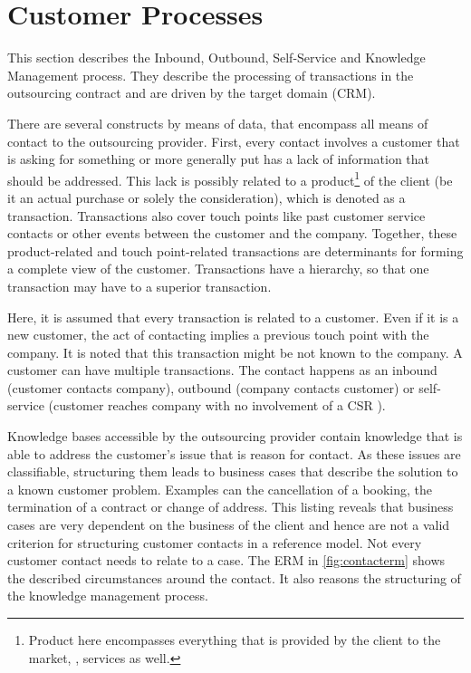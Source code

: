 	\section{Customer Processes}
	
	This section describes the Inbound, Outbound, Self-Service and Knowledge Management process. They describe the processing of transactions in the outsourcing contract and are driven by the target domain (\acrshort{CRM}). 
	
	There are several constructs by means of data, that encompass all means of contact to the outsourcing provider. First, every contact involves a customer that is asking for something or more generally put has a lack of information that should be addressed. This lack is possibly related to a product\footnote{Product here encompasses everything that is provided by the client to the market, \ie, services as well.} of the client (be it an actual purchase or solely the consideration), which is denoted as a transaction. Transactions also cover touch points like past customer service contacts or other events between the customer and the company. Together, these product-related and touch point-related transactions are determinants for forming a complete view of the customer. Transactions have a hierarchy, so that one transaction may have to a superior transaction. 
	
	Here, it is assumed that every transaction is related to a customer. Even if it is a new customer, the act of contacting implies a previous touch point with the company. It is noted that this transaction might be not known to the company. A customer can have multiple transactions. The contact happens as an inbound (customer contacts company), outbound (company contacts customer) or self-service (customer reaches company with no involvement of a \acrshort{CSR} ). 
	
	Knowledge bases accessible by the outsourcing provider contain knowledge that is able to address the customer's issue that is reason for contact. As these issues are classifiable, structuring them leads to business cases that describe the solution to a known customer problem. Examples can the cancellation of a booking, the termination of a contract or change of address. This listing reveals that business cases are very dependent on the business of the client and hence are not a valid criterion for structuring customer contacts in a reference model. Not every customer contact needs to relate to a case. The \acrshort{ERM} in \Fig \ref{fig:contacterm} shows the described circumstances around the contact. It also reasons the structuring of the knowledge management process. 
	
